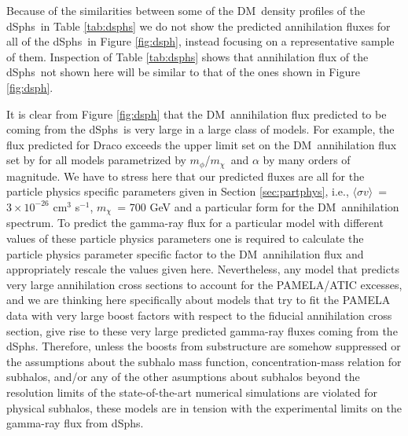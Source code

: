 \documentclass[aps,prd,twocolumn,amsmath,amssymb,floatfix,nofootinbib,10pt]{revtex4}
\newcommand{\ie}{i.e.}
\newcommand{\DM}{DM}
\newcommand{\mdm}{\ensuremath{m_{\chi}}}
\newcommand{\mv}{\ensuremath{m_{\phi}}}
\newcommand{\sigmaannv}{\ensuremath{\langle\sigma v\rangle}}
\newcommand{\dSphs}{dSphs}
\begin{document}
Because of the similarities between some of the \DM\ density profiles
of the \dSphs\ in Table \ref{tab:dsphs} we do not show the predicted
annihilation fluxes for all of the \dSphs\ in Figure \ref{fig:dsph},
instead focusing on a representative sample of them. Inspection of
Table \ref{tab:dsphs} shows that annihilation flux of the \dSphs\ not
shown here will be similar to that of the ones shown in Figure
\ref{fig:dsph}.




It is clear from Figure \ref{fig:dsph} that the \DM\ annihilation flux
predicted to be coming from the \dSphs\ is very large in a large class
of models. For example, the flux predicted for Draco exceeds the upper
limit set on the \DM\ annihilation flux set by
\cite{2008ApJ...679..428A} for all models parametrized by \mv/\mdm\
and $\alpha$ by many orders of magnitude. We have to stress here that
our predicted fluxes are all for the particle physics specific
parameters given in Section \ref{sec:partphys}, \ie, \sigmaannv\ = $3
\times 10^{-26}$ cm$^3$ s$^{-1}$, \mdm\ = 700 GeV and a particular
form for the \DM\ annihilation spectrum. To predict the gamma-ray flux
for a particular model with different values of these particle physics
parameters one is required to calculate the particle physics parameter
specific factor to the \DM\ annihilation flux and appropriately
rescale the values given here. Nevertheless, any model that predicts
very large annihilation cross sections to account for the PAMELA/ATIC
excesses, and we are thinking here specifically about models that try
to fit the PAMELA data with very large boost factors with respect to
the fiducial annihilation cross section, give rise to these very large
predicted gamma-ray fluxes coming from the \dSphs. Therefore, unless
the boosts from substructure are somehow suppressed or the assumptions
about the subhalo mass function, concentration-mass relation for
subhalos, and/or any of the other asumptions about subhalos beyond the
resolution limits of the state-of-the-art numerical simulations are
violated for physical subhalos, these models are in tension with the
experimental limits on the gamma-ray flux from \dSphs.

\end{document}
